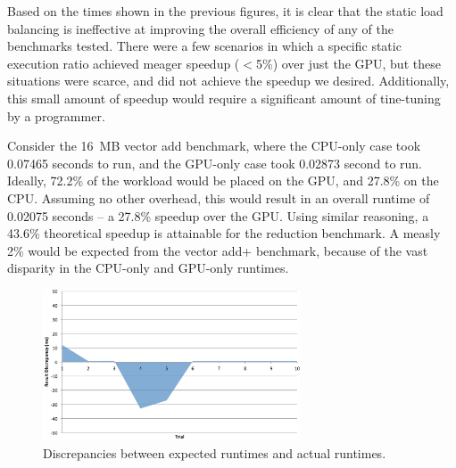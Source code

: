 \documentclass[journal]{IEEEtran}
\begin{document}




Based on the times shown in the previous figures, it is clear that the
static load balancing is ineffective at improving the overall efficiency
of any of the benchmarks tested.  There were a few scenarios in which
a specific static execution ratio achieved meager speedup ($<$5\%) over
just the GPU, but these situations were scarce, and did not achieve the
speedup we desired.  Additionally, this small amount of speedup would
require a significant amount of tine-tuning by a programmer.

Consider the 16~MB vector add benchmark, where the CPU-only case took
0.07465 seconds to run, and the GPU-only case took 0.02873 second to run.
Ideally, 72.2\% of the workload would be placed on the GPU, and 27.8\%
on the CPU.  Assuming no other overhead, this would result in an overall
runtime of 0.02075 seconds -- a 27.8\% speedup over the GPU.  Using similar
reasoning, a 43.6\% theoretical speedup is attainable for the reduction
benchmark.  A measly 2\% would be expected from the vector add+ benchmark,
because of the vast disparity in the CPU-only and GPU-only runtimes.

\begin{figure}[t]
\centering
\includegraphics[width=3.0in]{sequential_discrepancy}
\caption{Discrepancies between expected runtimes and actual runtimes.}
\label{fig:sequential_discrepancy}
\end{figure}
\end{document}

